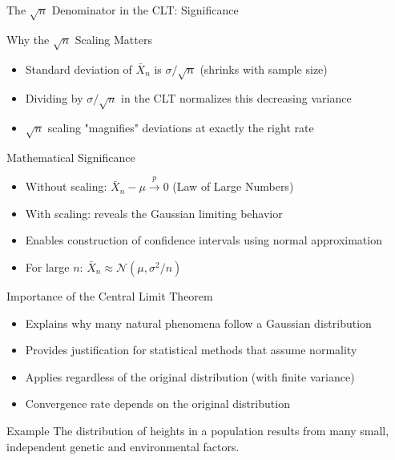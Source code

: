 \documentclass{beamer}
\begin{document}
\begin{frame}{The $\sqrt{n}$ Denominator in the CLT: Significance}
  \begin{block}{Why the $\sqrt{n}$ Scaling Matters}
    \begin{itemize}
      \item Standard deviation of $\bar{X}_n$ is $\sigma/\sqrt{n}$ (shrinks with sample size)
      \item Dividing by $\sigma/\sqrt{n}$ in the CLT normalizes this decreasing variance
      \item $\sqrt{n}$ scaling "magnifies" deviations at exactly the right rate
    \end{itemize}
  \end{block}
  
  \begin{block}{Mathematical Significance}
    \begin{itemize}
      \item Without scaling: $\bar{X}_n - \mu \stackrel{p}{\to} 0$ (Law of Large Numbers)
      \item With scaling: reveals the Gaussian limiting behavior
      \item Enables construction of confidence intervals using normal approximation
      \item For large $n$: $\bar{X}_n \approx \mathcal{N}(\mu, \sigma^2/n)$
    \end{itemize}
  \end{block}
\end{frame}

\begin{frame}{Importance of the Central Limit Theorem}
  \begin{itemize}
    \item Explains why many natural phenomena follow a Gaussian distribution
    \item Provides justification for statistical methods that assume normality
    \item Applies regardless of the original distribution (with finite variance)
    \item Convergence rate depends on the original distribution
  \end{itemize}
  
  \begin{block}{Example}
    The distribution of heights in a population results from many small, independent genetic and environmental factors.
  \end{block}
\end{frame}
\end{document}
